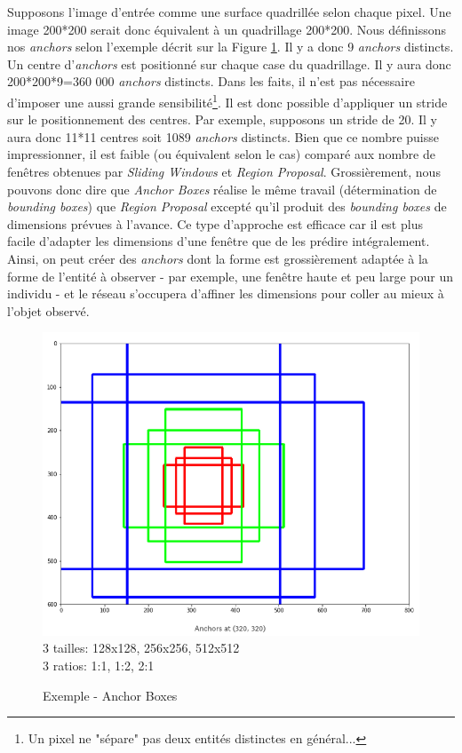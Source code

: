 \noindent Supposons l'image d'entrée comme une surface quadrillée selon chaque pixel. Une image 200*200 serait donc équivalent à un quadrillage 200*200. Nous définissons nos \textit{anchors} selon l'exemple décrit sur la Figure \ref{anchor}. Il y a donc 9 \textit{anchors} distincts. Un centre d'\textit{anchors} est positionné sur chaque case du quadrillage. Il y aura donc 200*200*9=360 000 \textit{anchors} distincts. Dans les faits, il n'est pas nécessaire d'imposer une aussi grande sensibilité\footnote{Un pixel ne "sépare" pas deux entités distinctes en général...}. Il est donc possible d'appliquer un stride sur le positionnement des centres. Par exemple, supposons un stride de 20. Il y aura donc 11*11 centres soit 1089 \textit{anchors} distincts. Bien que ce nombre puisse impressionner, il est faible (ou équivalent selon le cas) comparé aux nombre de fenêtres obtenues par \textit{Sliding Windows} et \textit{Region Proposal}. Grossièrement, nous pouvons donc dire que \textit{Anchor Boxes} réalise le même travail (détermination de \textit{bounding boxes}) que \textit{Region Proposal} excepté qu'il produit des \textit{bounding boxes} de dimensions prévues à l'avance. Ce type d'approche est efficace car il est plus facile d'adapter les dimensions d'une fenêtre que de les prédire intégralement. Ainsi, on peut créer des \textit{anchors} dont la forme est grossièrement adaptée à la forme de l'entité à observer - par exemple, une fenêtre haute et peu large pour un individu - et le réseau s'occupera d'affiner les dimensions pour coller au mieux à l'objet observé.

\begin{figure}
    \centering
    \includegraphics[scale=0.3]{./tex/computer-vision/object-recognition/anchor.png}
    \\3 tailles: 128x128, 256x256, 512x512\\
    3 ratios: 1:1, 1:2, 2:1
    \caption{Exemple - Anchor Boxes}
    \label{anchor}
\end{figure}


